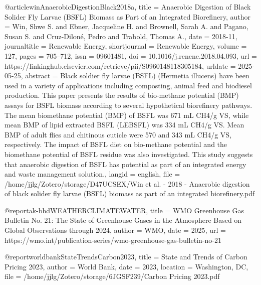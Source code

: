 {{{{@article{winAnaerobicDigestionBlack2018a,
  title = {Anaerobic Digestion of Black Solider Fly Larvae ({{BSFL}}) Biomass as Part of an Integrated Biorefinery},
  author = {Win, Shwe S. and Ebner, Jacqueline H. and Brownell, Sarah A. and Pagano, Susan S. and Cruz-Diloné, Pedro and Trabold, Thomas A.},
  date = {2018-11},
  journaltitle = {Renewable Energy},
  shortjournal = {Renewable Energy},
  volume = {127},
  pages = {705--712},
  issn = {09601481},
  doi = {10.1016/j.renene.2018.04.093},
  url = {https://linkinghub.elsevier.com/retrieve/pii/S0960148118305184},
  urldate = {2025-05-25},
  abstract = {Black soldier fly larvae (BSFL) (Hermetia illucens) have been used in a variety of applications including composting, animal feed and biodiesel production. This paper presents the results of bio-methane potential (BMP) assays for BSFL biomass according to several hypothetical biorefinery pathways. The mean biomethane potential (BMP) of BSFL was 671 mL CH4/g VS, while mean BMP of lipid extracted BSFL (LEBSFL) was 334 mL CH4/g VS. Mean BMP of adult flies and chitinous cuticle were 570 and 343 mL CH4/g VS, respectively. The impact of BSFL diet on bio-methane potential and the biomethane potential of BSFL residue was also investigated. This study suggests that anaerobic digestion of BSFL has potential as part of an integrated energy and waste management solution.},
  langid = {english},
  file = {/home/jjlg/Zotero/storage/D47UCSEX/Win et al. - 2018 - Anaerobic digestion of black solider fly larvae (BSFL) biomass as part of an integrated biorefinery.pdf}
}

@report{ak-bhdWEATHERCLIMATEWATER,
  title = {{{WMO Greenhouse Gas Bulletin No}}. 21: {{The State}} of {{Greenhouse Gases}} in the {{Atmosphere Based}} on {{Global Observations}} through 2024},
  author = {WMO},
  date = {2025},
  url = {https://wmo.int/publication-series/wmo-greenhouse-gas-bulletin-no-21}
}

@report{worldbankStateTrendsCarbon2023,
  title = {State and {{Trends}} of {{Carbon Pricing}} 2023},
  author = {World Bank},
  date = {2023},
  location = {Washington, DC},
  file = {/home/jjlg/Zotero/storage/6JGSF239/Carbon Pricing 2023.pdf}
}

}}}}
